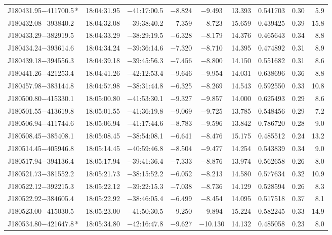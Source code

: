 \begin{table*}
\begin{tabular}{lcccccccr}
J180431.95$-$411700.5\,* & 18:04:31.95 & $-$41:17:00.5 & $-$8.824 & $-$9.493 & 13.393 & 0.541703 & 0.30 & 5.9 \\
J180432.08$-$393840.2 & 18:04:32.08 & $-$39:38:40.2 & $-$7.359 & $-$8.723 & 15.659 & 0.439425 & 0.39 & 15.8 \\
J180433.29$-$382919.5 & 18:04:33.29 & $-$38:29:19.5 & $-$6.328 & $-$8.179 & 14.376 & 0.465643 & 0.34 & 8.8 \\
J180434.24$-$393614.6 & 18:04:34.24 & $-$39:36:14.6 & $-$7.320 & $-$8.710 & 14.395 & 0.474892 & 0.31 & 8.9 \\
J180439.18$-$394556.3 & 18:04:39.18 & $-$39:45:56.3 & $-$7.456 & $-$8.800 & 14.150 & 0.551682 & 0.31 & 8.6 \\
J180441.26$-$421253.4 & 18:04:41.26 & $-$42:12:53.4 & $-$9.646 & $-$9.954 & 14.031 & 0.638696 & 0.36 & 8.8 \\
J180457.98$-$383144.8 & 18:04:57.98 & $-$38:31:44.8 & $-$6.325 & $-$8.269 & 14.543 & 0.592550 & 0.33 & 10.8 \\
J180500.80$-$415330.1 & 18:05:00.80 & $-$41:53:30.1 & $-$9.327 & $-$9.857 & 14.000 & 0.625493 & 0.29 & 8.6 \\
J180501.55$-$413619.8 & 18:05:01.55 & $-$41:36:19.8 & $-$9.069 & $-$9.725 & 13.785 & 0.548456 & 0.29 & 7.2 \\
J180506.94$-$411744.6 & 18:05:06.94 & $-$41:17:44.6 & $-$8.783 & $-$9.596 & 13.842 & 0.786720 & 0.28 & 9.0 \\
J180508.45$-$385408.1 & 18:05:08.45 & $-$38:54:08.1 & $-$6.641 & $-$8.476 & 15.175 & 0.485512 & 0.24 & 13.2 \\
J180514.45$-$405946.8 & 18:05:14.45 & $-$40:59:46.8 & $-$8.504 & $-$9.477 & 14.254 & 0.543839 & 0.34 & 9.0 \\
J180517.94$-$394136.4 & 18:05:17.94 & $-$39:41:36.4 & $-$7.333 & $-$8.876 & 13.974 & 0.562658 & 0.26 & 8.0 \\
J180521.73$-$381552.2 & 18:05:21.73 & $-$38:15:52.2 & $-$6.052 & $-$8.213 & 14.580 & 0.577634 & 0.32 & 10.9 \\
J180522.12$-$392215.3 & 18:05:22.12 & $-$39:22:15.3 & $-$7.038 & $-$8.736 & 14.129 & 0.528594 & 0.26 & 8.3 \\
J180522.92$-$384605.4 & 18:05:22.92 & $-$38:46:05.4 & $-$6.499 & $-$8.454 & 14.095 & 0.517518 & 0.37 & 8.1 \\
J180523.00$-$415030.5 & 18:05:23.00 & $-$41:50:30.5 & $-$9.250 & $-$9.894 & 15.224 & 0.582245 & 0.33 & 14.9 \\
J180534.80$-$421647.8\,* & 18:05:34.80 & $-$42:16:47.8 & $-$9.627 & $-$10.130 & 14.132 & 0.485058 & 0.23 & 8.0 \\

\end{tabular}
\end{table*}
